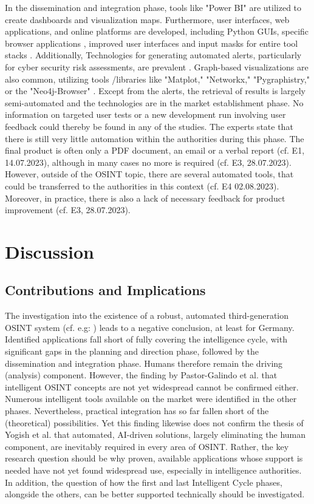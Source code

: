 \documentclass[10pt]{article}
\begin{document}
In the dissemination and integration phase, tools like "Power BI" \cite{Tao.2023}
are utilized to create dashboards and visualization maps. Furthermore, user interfaces,
web applications, and online platforms are developed, including Python GUIs,
specific browser applications \cite{Elmas.2022},
improved user interfaces and input masks for entire tool stacks \cite{Arjun.2020}.
Additionally, Technologies for generating automated alerts, particularly for cyber security risk assessments,
are prevalent \cite{Ahuja.2022}. Graph-based visualizations are also common, utilizing tools
/libraries like "Matplot," "Networkx," "Pygraphistry," or the "Neo4j-Browser" \cite{Middleton.2020}.
Except from the alerts, the retrieval of results is largely semi-automated and the technologies are in the
market establishment phase. No information on targeted user tests or a new development run involving
user feedback could thereby be found in any of the studies. The experts state that there is still very little
automation within the authorities during this phase. The final product is often only a PDF document,
an email or a verbal report (cf. E1, 14.07.2023), although in many cases no more is required (cf. E3, 28.07.2023).
However, outside of the OSINT topic, there are several automated tools, that could be transferred
to the authorities in this context (cf. E4 02.08.2023). Moreover, in practice, there is also a lack of
necessary feedback for product improvement (cf. E3, 28.07.2023).

\section{Discussion} \label{sec:discussion}

\subsection{Contributions and Implications}

The investigation into the existence of a robust, automated third-generation OSINT system
(cf. e.g: \cite{Ghioni.2023,PastorGalindo.2020,Yogish.2021})
leads to a negative conclusion, at least for Germany. Identified applications fall short of fully covering
the intelligence cycle, with significant gaps in the planning and direction phase,
followed by the dissemination and integration phase. Humans therefore remain the driving (analysis)
component. However, the finding by Pastor-Galindo et al. \cite{PastorGalindo.2020} that intelligent OSINT
concepts are not yet widespread cannot be confirmed either. Numerous intelligent tools available
on the market were identified in the other phases. Nevertheless, practical integration has so far
fallen short of the (theoretical) possibilities. Yet this finding likewise does not confirm the
thesis of Yogish et al. \cite{Yogish.2021} that automated, AI-driven solutions, largely eliminating
the human component, are inevitably required in every area of OSINT. Rather, the key research
question should be why proven, available applications whose support is needed have not
yet found widespread use, especially in intelligence authorities. In addition, the question of how the
first and last Intelligent Cycle phases, alongside the others, can be better supported technically
should be investigated.
\end{document}
